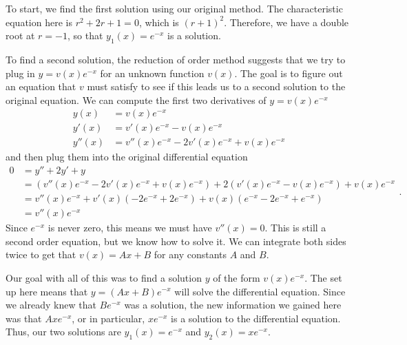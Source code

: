 \documentclass{ximera}
\begin{document}
\begin{exampleSol}
    To start, we find the first solution using our original method. The characteristic equation here is $r^2 + 2r + 1 = 0$, which is $(r+1)^2$. Therefore, we have a double root at $r=-1$, so that $y_1(x) = e^{-x}$ is a solution.
    
    To find a second solution, the reduction of order method suggests that we try to plug in $y = v(x)e^{-x}$ for an unknown function $v(x)$. The goal is to figure out an equation that $v$ must satisfy to see if this leads us to a second solution to the original equation. We can compute the first two derivatives of $y = v(x) e^{-x}$ 
    \begin{equation*}
        \begin{split}
            y(x) &= v(x)e^{-x} \\
            y'(x) &= v'(x)e^{-x} - v(x)e^{-x} \\
            y''(x) &= v''(x)e^{-x} - 2v'(x)e^{-x} + v(x)e^{-x} 
        \end{split}
    \end{equation*}
    and then plug them into the original differential equation
    \begin{equation*}
        \begin{split}
            0 &= y'' + 2y' + y \\
            &= (v''(x)e^{-x} - 2v'(x)e^{-x} + v(x)e^{-x}) + 2(v'(x)e^{-x} - v(x)e^{-x}) + v(x)e^{-x} \\
            &= v''(x)e^{-x} + v'(x)(-2e^{-x}+2e^{-x}) + v(x)(e^{-x} - 2e^{-x} + e^{-x}) \\
            &= v''(x)e^{-x}
        \end{split}.
    \end{equation*}
    Since $e^{-x}$ is never zero, this means we must have $v''(x) = 0$. This is still a second order equation, but we know how to solve it. We can integrate both sides twice to get that $v(x) = Ax + B$ for any constants $A$ and $B$. 
    
    Our goal with all of this was to find a solution $y$ of the form $v(x)e^{-x}$. The set up here means that $y = (Ax + B)e^{-x}$ will solve the differential equation. Since we already knew that $Be^{-x}$ was a solution, the new information we gained here was that $Axe^{-x}$, or in particular, $xe^{-x}$ is a solution to the differential equation. Thus, our two solutions are $y_1(x) = e^{-x}$ and $y_2(x) = xe^{-x}$. 
\end{exampleSol}
\end{document}
